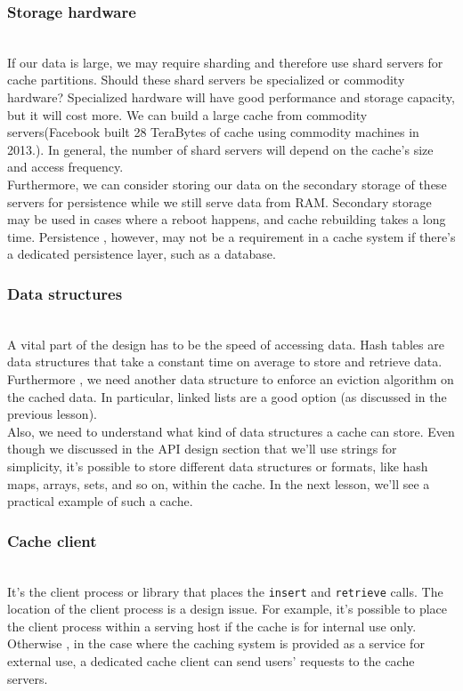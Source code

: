 \subsubsection{Storage hardware}\label{aqgrB7cgEFZOlEELkm-Km}
\\
If our data is large, we may require sharding and therefore use shard servers for cache partitions. Should these shard servers be specialized or commodity hardware? Specialized hardware will have good performance and storage capacity, but it will cost more. We can build a large cache from commodity servers(Facebook built 28 TeraBytes of cache using commodity machines in 2013.). In general, the number of shard servers will depend on the cache's size and access frequency.
\\
Furthermore, we can consider storing our data on the secondary storage of these servers for persistence while we still serve data from RAM. Secondary storage may be used in cases where a reboot happens, and cache rebuilding takes a long time. Persistence , however, may not be a requirement in a cache system if there's a dedicated persistence layer, such as a database.

\subsubsection{Data structures}\label{snn0_SpaUMXYgs1FM8h2z}
\\
A vital part of the design has to be the speed of accessing data. Hash tables are data structures that take a constant time on average to store and retrieve data. Furthermore , we need another data structure to enforce an eviction algorithm on the cached data. In particular, linked lists are a good option (as discussed in the previous lesson).
\\
Also, we need to understand what kind of data structures a cache can store. Even though we discussed in the API design section that we'll use strings for simplicity, it's possible to store different data structures or formats, like hash maps, arrays, sets, and so on, within the cache. In the next lesson, we'll see a practical example of such a cache.

\subsubsection{Cache client}\label{eikN-V5MVLo9S1FpxMez8}
\\
It's the client process or library that places the \texttt{insert} and \texttt{retrieve} calls. The location of the client process is a design issue. For example, it's possible to place the client process within a serving host if the cache is for internal use only. Otherwise , in the case where the caching system is provided as a service for external use, a dedicated cache client can send users' requests to the cache servers.

